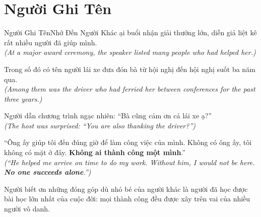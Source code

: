 \section{Người Ghi Tên}
\begin{truyen}{Người Ghi Tên}{Nhớ Đến Người Khác}
ại buổi nhận giải thưởng lớn, diễn giả liệt kê rất nhiều người đã giúp mình.\\
\textit{(At a major award ceremony, the speaker listed many people who had helped her.)}

Trong số đó có tên người lái xe đưa đón bà từ hội nghị đến hội nghị suốt ba năm qua.\\
\textit{(Among them was the driver who had ferried her between conferences for the past three years.)}

Người dẫn chương trình ngạc nhiên: ``Bà cũng cảm ơn cả lái xe ạ?''\\
\textit{(The host was surprised: ``You are also thanking the driver?'')}

``Ông ấy giúp tôi đến đúng giờ để làm công việc của mình. Không có ông ấy, tôi không có mặt ở đây. \textbf{Không ai thành công một mình}.''\\
\textit{(``He helped me arrive on time to do my work. Without him, I would not be here. \textbf{No one succeeds alone}.'')}
\end{truyen}
\begin{baihoc}
  Người biết ơn những đóng góp dù nhỏ bé của người khác là người đã học được bài học lớn nhất của cuộc đời: mọi thành công đều được xây trên vai của nhiều người vô danh.
\end{baihoc}


